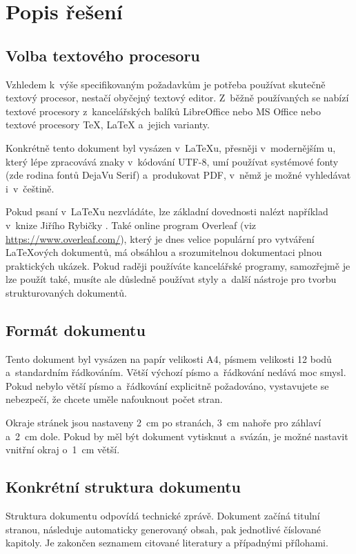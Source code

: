 \chapter{Popis řešení}

\section{Volba textového procesoru}
Vzhledem k~výše specifikovaným požadavkům je potřeba používat skutečně textový procesor, nestačí obyčejný textový editor. Z~běžně používaných se nabízí textové procesory z~kancelářských balíků LibreOffice nebo MS Office nebo textové procesory {\TeX}, {\LaTeX} a~jejich varianty.

Konkrétně tento dokument byl vysázen v~{\LaTeX}u, přesněji v~modernějším {\XeLaTeX}u, který lépe zpracovává znaky v~kódování UTF-8, umí používat systémové fonty (zde rodina fontů DejaVu Serif) a~produkovat PDF, v~němž je možné vyhledávat i~v~češtině.

Pokud psaní v~\LaTeX{u} nezvládáte, lze základní dovednosti nalézt například v~knize Jiřího Rybičky \parencite{rybitex}. Také online program Overleaf (viz \url{https://www.overleaf.com/}), který je dnes velice populární pro vytváření \LaTeX{ových} dokumentů, má obsáhlou a srozumitelnou dokumentaci plnou praktických ukázek. Pokud raději používáte kancelářské programy, samozřejmě je lze použít také, musíte ale důsledně používat styly a~další nástroje pro tvorbu strukturovaných dokumentů.

\section{Formát dokumentu}
Tento dokument byl vysázen na papír velikosti A4, písmem velikosti 12 bodů a~standardním řádkováním. Větší výchozí písmo a~řádkování nedává moc smysl. Pokud nebylo větší písmo a~řádkování explicitně požadováno, vystavujete se nebezpečí, že chcete uměle nafouknout počet stran.

Okraje stránek jsou nastaveny 2~cm po stranách, 3~cm nahoře pro záhlaví a~2~cm dole. Pokud by měl být dokument vytisknut a~svázán, je možné nastavit vnitřní okraj o~1~cm větší.

\section{Konkrétní struktura dokumentu}
Struktura dokumentu odpovídá technické zprávě. Dokument začíná titulní stranou, následuje automaticky generovaný obsah, pak jednotlivé číslované kapitoly. Je zakončen seznamem citované literatury a případnými přílohami.

